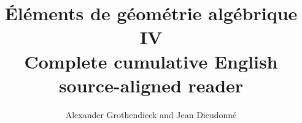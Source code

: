 
\setlength{\emergencystretch}{3em}



\title{Éléments de géométrie algébrique IV\\Complete cumulative English source-aligned reader}
\author{Alexander Grothendieck and Jean Dieudonn\'e}
\date{}
\maketitle
\tableofcontents





























